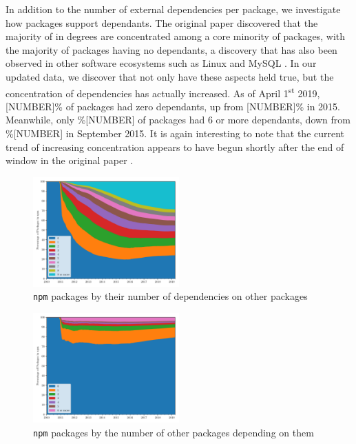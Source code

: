 \documentclass[10pt,conference]{IEEEtran}
\def\code#1{\texttt{#1}}
\begin{document}
  In addition to the number of external dependencies per package, 
  we investigate how packages support dependants. The original paper 
  discovered that the majority of in degrees are concentrated among a core 
  minority of packages, with the majority of packages having no dependants,
  a discovery that has also been observed in other software ecosystems such
  as Linux and MySQL \cite{Myers:2003}. In our updated data, we discover 
  that not only have these aspects held true, but the concentration of 
  dependencies has actually increased. As of April 1\textsuperscript{st} 2019, [NUMBER]\% of packages
  had zero dependants, up from [NUMBER]\% in 2015. Meanwhile, only \%[NUMBER] of packages
  had 6 or more dependants, down from \%[NUMBER] in September 2015. It is again interesting to note
  that the current trend of increasing concentration appears to have begun shortly after the end of window in the original
  paper \cite{Wittern:2016}.

  \begin{figure}
    \includegraphics[width=0.5\textwidth]{figures/npm_deps_monthly_out_degree.pdf}
    \caption{\code{npm} packages by their number of dependencies on other packages}
    \label{outDegree}
  \end{figure}

  \begin{figure}
    \includegraphics[width=0.5\textwidth]{figures/npm_deps_monthly_in_degree.pdf}
    \caption{\code{npm} packages by the number of other packages depending on them}
    \label{inDegree}
  \end{figure}
\end{document}
